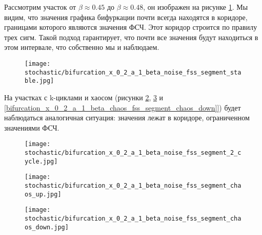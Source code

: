         Рассмотрим участок от \(\beta \approx 0.45\) до \(\beta \approx 0.48\), он изображен на рисунке \ref{bifurcation_x_0_2_a_1_beta_chaos_fss_segment_stable}. Мы видим, что значения графика бифуркации почти всегда находятся в коридоре, границами которого являются значения ФСЧ. Этот коридор строится по правилу трех сигм. Такой подход гарантирует, что почти все значения будут находиться в этом интервале, что собственно мы и наблюдаем.

        \begin{figure}
            \centering
            \texttt{[image: stochastic/bifurcation\_x\_0\_2\_a\_1\_beta\_noise\_fss\_segment\_stable.jpg]}
        
            \captionsetup{justification=centering}
            \caption{}
            \label{bifurcation_x_0_2_a_1_beta_chaos_fss_segment_stable}
        \end{figure}

        На участках с k-циклами и хаосом (рисунки \ref{bifurcation_x_0_2_a_1_beta_chaos_fss_segment_2_cycle}, \ref{bifurcation_x_0_2_a_1_beta_chaos_fss_segment_chaos_up} и \ref{bifurcation_x_0_2_a_1_beta_chaos_fss_segment_chaos_down]}) будет наблюдаться аналогичная ситуация: значения лежат в коридоре, ограниченном значениями ФСЧ.

        \begin{figure}
            \centering
            \texttt{[image: stochastic/bifurcation\_x\_0\_2\_a\_1\_beta\_noise\_fss\_segment\_2\_cycle.jpg]}
        
            \captionsetup{justification=centering}
            \caption{}
            \label{bifurcation_x_0_2_a_1_beta_chaos_fss_segment_2_cycle}
        \end{figure}

        \begin{figure}
            \centering
            \texttt{[image: stochastic/bifurcation\_x\_0\_2\_a\_1\_beta\_noise\_fss\_segment\_chaos\_up.jpg]}
        
            \captionsetup{justification=centering}
            \caption{}
            \label{bifurcation_x_0_2_a_1_beta_chaos_fss_segment_chaos_up}
        \end{figure}

        \begin{figure}
            \centering
            \texttt{[image: stochastic/bifurcation\_x\_0\_2\_a\_1\_beta\_noise\_fss\_segment\_chaos\_down.jpg]}
        
            \captionsetup{justification=centering}
            \caption{}
            \label{bifurcation_x_0_2_a_1_beta_chaos_fss_segment_chaos_down}
        \end{figure}

